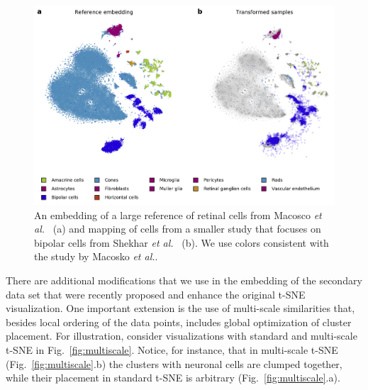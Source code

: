 \documentclass[runningheads]{llncs}
\newcommand{\etal}{\textit{et al.}}
\begin{document}
\begin{figure}[htb]
\includegraphics[width=\textwidth]{figures/transform_retina.pdf}
\caption{An embedding of a large reference of retinal cells from Macosco
\etal~\cite{macosko2015} (a) and mapping of cells from a smaller study that
focuses on bipolar cells from Shekhar \etal~\cite{shekhar2016} (b). We use
colors consistent with the study by Macosko \etal.} \label{fig:transform_retina}
\end{figure}

There are additional modifications that we use in the embedding of the
secondary data set that were recently proposed and enhance the original t-SNE visualization.
One important extension is the use of multi-scale similarities that, besides local ordering of the
data points, includes global optimization of cluster placement. For
illustration, consider visualizations with standard and multi-scale t-SNE in
Fig.~\ref{fig:multiscale}. Notice, for instance, that in multi-scale t-SNE
(Fig.~\ref{fig:multiscale}.b) the clusters with neuronal cells are clumped
together, while their placement in standard t-SNE is arbitrary
(Fig.~\ref{fig:multiscale}.a).
\end{document}
